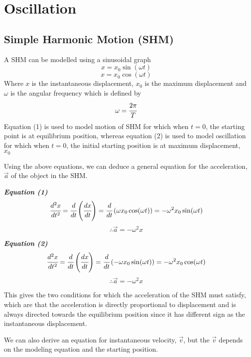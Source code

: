 \documentclass{article}
\begin{document}

\newpage
\section{Oscillation}


     \subsection{Simple Harmonic Motion (SHM)}


A SHM can be modelled using a sinusoidal graph
\begin{equation}
 x=x_0\sin (\omega t) 
 \end{equation}
 \begin{equation}
     x=x_0\cos (\omega t)
 \end{equation}
 Where $x$ is the instantaneous displacement, $x_0$ is the maximum displacement and $\omega$ is the angular frequency which is defined by 
 $$\omega =\cfrac{2\pi}{T}$$
 Equation (1) is used to model motion of SHM for which when $t=0$, the starting point is at equilibrium position, whereas equation (2) is used to model oscillation for which when $t=0$, the initial starting position is at maximum displacement, $x_0$
  
 Using the above equations, we can deduce a general equation for the acceleration, $\vec{a}$ of the object in the SHM.
 
 \textbf{\textit{Equation (1)}}
 $$\cfrac{d^2x}{dt^2}=\cfrac{d}{dt}\left(\cfrac{dx}{dt}\right)=\cfrac{d}{dt}\left(\omega x_0 \cos (\omega t)\right)=-\omega^2 x_0 \sin (\omega t)$$
 $$\therefore \vec{a}=-\omega^2 x$$

 \textbf{\textit{Equation (2)}}
 $$\cfrac{d^2x}{dt^2}=\cfrac{d}{dt}\left(\cfrac{dx}{dt}\right)=\cfrac{d}{dt}\left(-\omega x_0 \sin (\omega t)\right)=-\omega^2 x_0 \cos (\omega t)$$
 $$\therefore \vec{a}=-\omega^2 x $$
 
 This gives the two conditions for which the acceleration of the SHM must satisfy, which are that the acceleration is directly proportional to displacement and is always directed towards the equilibrium position since it has different sign as the instantaneous displacement.
 
 We can also derive an equation for instantaneous velocity, $\vec{v}$, but the $\vec{v}$ depends on the modeling equation and the starting position.
 
\end{document}
